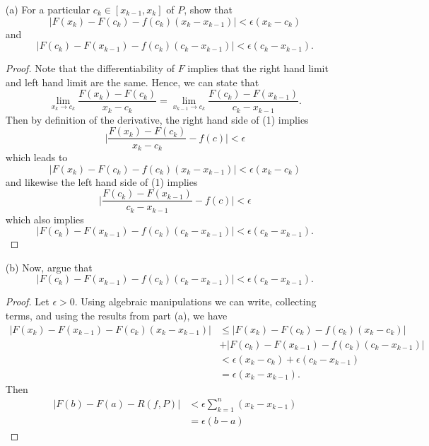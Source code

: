 \begin{enumerate}
    \item[(a)] For a particular \( c_{k } \in [x_{k-1}, x_{k } ]  \) of \( P  \), show that  
\[  | F(x_{k }) - F(c_{k}) - f(c_{k })(x_{k } - x_{k-1})  | < \epsilon ( x_{k } - c_{k }) \] and 
\[  | F(c_{k}) - F(x_{k-1}) - f(c_{k })(c_{k} - x_{k-1})   | <  \epsilon (c_{k } -  x_{k-1}). \]
\begin{proof}
Note that the differentiability of \( F \) implies that the right hand limit and left hand limit are the same. Hence, we can state that 
\[ \lim_{ x_{k}  \to c_{k }  }  \frac{ F(x_{k } ) - F(c_{k })  }{ x_{k } - c_{k}  } = \lim_{ x_{k-1}  \to c_{k }  } \frac{ F(c_{k }) - F(x_{k-1}) }{ c_{k } - x_{k-1} }. \tag{1}  \] Then by definition of the derivative, the right hand side of (1) implies
\[  \Big| \frac{ F(x_{k } ) - F(c_{k }) }{ x_{k } - c_{k } }  - f(c)  \Big| < \epsilon  \] which leads to 
\[  | F(x_{k }) - F(c_{k}) - f(c_{k })(x_{k } - x_{k-1})  | < \epsilon ( x_{k } - c_{k }) \] and  likewise the left hand side of (1) implies
\[  \Big| \frac{ F(c_{k } ) - F(x_{k-1}) }{ c_{k} - x_{k-1} } - f(c) \Big| < \epsilon \] which also implies 
\[  | F(c_{k}) - F(x_{k-1}) - f(c_{k })(c_{k} - x_{k-1})   | <  \epsilon (c_{k } -  x_{k-1}). \]
\end{proof}
    \item[(b)] Now, argue that 
        \[  | F(c_{k }) - F(x_{k-1}) - f(c_{k } )(c_{k} - x_{k-1}) | < \epsilon (c_{k } - x_{k-1}). \]
        \begin{proof}
        Let \( \epsilon > 0  \). Using algebraic manipulations we can write, collecting terms, and using the results from part (a), we have
        \begin{align*}
            | F(x_{k}) - F(x_{k-1}) -F(c_{k})(x_{k } - x_{k-1}) | &\leq | F(x_{k}) - F(c_{k } ) - f(c_{k}  ) (x_{k } - c_{k }) | \\&+ | F(c_{k})  - F(x_{k-1}) - f(c_{k }) (c_{k} - x_{k-1}) |   \\
                                                                  &< \epsilon (x_{k } - c_{k }) + \epsilon(c_{k } - x_{k-1}) \\
                                                                  &= \epsilon(x_{k } - x_{k-1}).
        \end{align*}
        Then 
        \begin{align*}
            | F(b) - F(a) - R(f,P)   | &<  \epsilon  \sum_{ k=1 }^{ n } ( x_{k } - x_{k-1}) \\
                                       &=\epsilon (b -a )
        \end{align*}
        \end{proof}
\end{enumerate}


